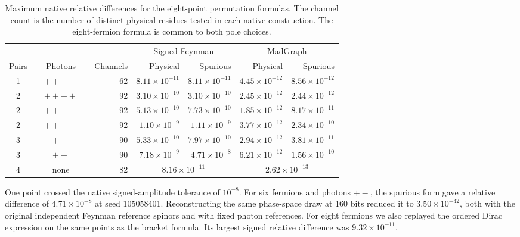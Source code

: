 \begin{table}[htbp]
\centering
\begin{tabular}{ccr@{\qquad}rr@{\qquad}rr}
\toprule
 & & & \multicolumn{2}{c}{Signed Feynman} & \multicolumn{2}{c}{MadGraph} \\
Pairs & Photons & Channels & Physical & Spurious & Physical & Spurious \\
\midrule
1 & $+++---$ & 62 & $8.11\times10^{-11}$ & $8.11\times10^{-11}$ & $4.45\times10^{-12}$ & $8.56\times10^{-12}$ \\
2 & $++++$ & 92 & $3.10\times10^{-10}$ & $3.10\times10^{-10}$ & $2.45\times10^{-12}$ & $2.44\times10^{-12}$ \\
2 & $+++-$ & 92 & $5.13\times10^{-10}$ & $7.73\times10^{-10}$ & $1.85\times10^{-12}$ & $8.17\times10^{-11}$ \\
2 & $++--$ & 92 & $1.10\times10^{-9}$ & $1.11\times10^{-9}$ & $3.77\times10^{-12}$ & $2.34\times10^{-10}$ \\
3 & $++$ & 90 & $5.33\times10^{-10}$ & $7.97\times10^{-10}$ & $2.94\times10^{-12}$ & $3.81\times10^{-11}$ \\
3 & $+-$ & 90 & $7.18\times10^{-9}$ & $4.71\times10^{-8}$ & $6.21\times10^{-12}$ & $1.56\times10^{-10}$ \\
4 & none & 82 & \multicolumn{2}{c}{$8.16\times10^{-11}$} & \multicolumn{2}{c}{$2.62\times10^{-13}$} \\
\bottomrule
\end{tabular}
\caption{Maximum native relative differences for the eight-point
permutation formulas. The channel count is the number of distinct
physical residues tested in each native construction. The eight-fermion
formula is common to both pole choices.}
\label{tab:eight-remaining-tests}
\end{table}

One point crossed the native signed-amplitude tolerance of $10^{-8}$.
For six fermions and photons $+-$, the spurious form gave a relative
difference of $4.71\times10^{-8}$ at seed 105058401. Reconstructing
the same phase-space draw at 160 bits reduced it to
$3.50\times10^{-42}$, both with the original independent Feynman
reference spinors and with fixed photon references.
For eight fermions we also replayed the ordered Dirac expression on
the same points as the bracket formula. Its largest signed relative
difference was $9.32\times10^{-11}$.
